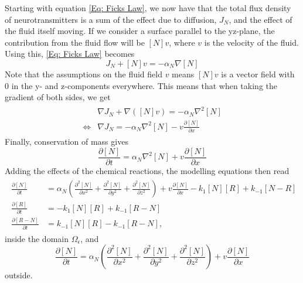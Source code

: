 \documentclass{article}
\begin{document}
Starting with equation \eqref{Eq: Ficks Law}, we now have that the total flux density of neurotransmitters is a sum of the effect due to diffusion, $J_N$, and the effect of the fluid itself moving. If we consider a surface parallel to the yz-plane, the contribution from the fluid flow will be $[N] v$, where $v$ is the velocity of the fluid. Using this, \eqref{Eq: Ficks Law} becomes
\begin{equation}
    J_N + [N]v = -\alpha_N \nabla [N]
\end{equation}
Note that the assumptions on the fluid field $v$ means $[N]v$ is a vector field with 0 in the y- and z-components everywhere. This means that when taking the gradient of both sides, we get
\begin{align}
\begin{split}
    & \nabla J_N + \nabla ([N]v) = -\alpha_N \nabla^2 [N]\\
    \Longleftrightarrow & \nabla J_N = -\alpha_N \nabla^2 [N] - v\frac{\partial [N]}{\partial x}
\end{split}
\end{align}
Finally, conservation of mass gives 
\begin{equation}
    \frac{\partial [N]}{\partial t} = \alpha_N \nabla^2 [N] + v\frac{\partial [N]}{\partial x}
\end{equation}
Adding the effects of the chemical reactions, the modelling equations then read
\begin{align}
\begin{split}
     \frac{\partial [N]}{\partial t} &= \alpha_N \left( \frac{\partial^2 [N]}{\partial x^2} + \frac{\partial^2 [N]}{\partial y^2} + \frac{\partial^2 [N]}{\partial z^2} \right) + v\frac{\partial [N]}{\partial x} -  k_1 [N] [R] +  k_{-1} [N-R]\\
     \frac{\partial [R]}{\partial t} &= - k_1[N][R] + k_{-1}[R-N]\\
    \frac{\partial [R-N]}{\partial t} &= k_{-1}[N][R] - k_{-1}[R-N],
\end{split}
\end{align}
inside the domain $\Omega_\epsilon$, and 
\begin{equation}
    \frac{\partial [N]}{\partial t} = \alpha_N \left( \frac{\partial^2 [N]}{\partial x^2} + \frac{\partial^2 [N]}{\partial y^2} + \frac{\partial^2 [N]}{\partial z^2} \right) + v\frac{\partial [N]}{\partial x}
\end{equation}
outside.
\end{document}
